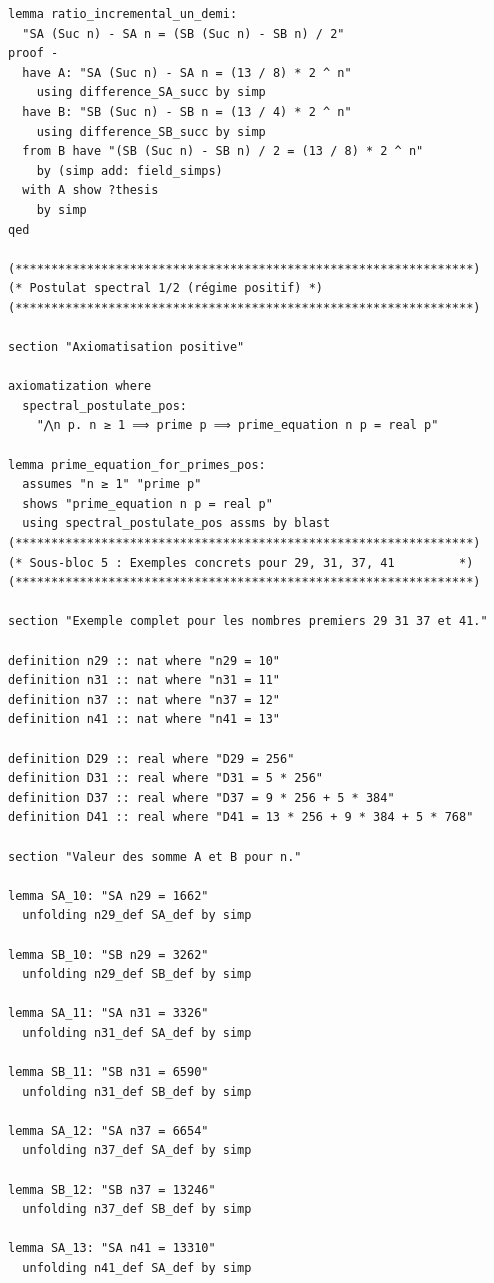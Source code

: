\documentclass[a4paper,11pt]{article}
\begin{document}
\begin{holcode}[title={\textcolor{white}{File: methode\_spectral.thy -- Part 1/4}}]
\begin{lstlisting}
lemma ratio_incremental_un_demi:
  "SA (Suc n) - SA n = (SB (Suc n) - SB n) / 2"
proof -
  have A: "SA (Suc n) - SA n = (13 / 8) * 2 ^ n"
    using difference_SA_succ by simp
  have B: "SB (Suc n) - SB n = (13 / 4) * 2 ^ n"
    using difference_SB_succ by simp
  from B have "(SB (Suc n) - SB n) / 2 = (13 / 8) * 2 ^ n"
    by (simp add: field_simps)
  with A show ?thesis
    by simp
qed

(****************************************************************)
(* Postulat spectral 1/2 (régime positif) *)
(****************************************************************)

section "Axiomatisation positive"

axiomatization where
  spectral_postulate_pos:
    "⋀n p. n ≥ 1 ⟹ prime p ⟹ prime_equation n p = real p"

lemma prime_equation_for_primes_pos:
  assumes "n ≥ 1" "prime p"
  shows "prime_equation n p = real p"
  using spectral_postulate_pos assms by blast
(****************************************************************)
(* Sous-bloc 5 : Exemples concrets pour 29, 31, 37, 41         *)
(****************************************************************)

section "Exemple complet pour les nombres premiers 29 31 37 et 41."

definition n29 :: nat where "n29 = 10"
definition n31 :: nat where "n31 = 11"
definition n37 :: nat where "n37 = 12"
definition n41 :: nat where "n41 = 13"

definition D29 :: real where "D29 = 256"
definition D31 :: real where "D31 = 5 * 256"
definition D37 :: real where "D37 = 9 * 256 + 5 * 384"
definition D41 :: real where "D41 = 13 * 256 + 9 * 384 + 5 * 768"

section "Valeur des somme A et B pour n."

lemma SA_10: "SA n29 = 1662"
  unfolding n29_def SA_def by simp

lemma SB_10: "SB n29 = 3262"
  unfolding n29_def SB_def by simp

lemma SA_11: "SA n31 = 3326"
  unfolding n31_def SA_def by simp

lemma SB_11: "SB n31 = 6590"
  unfolding n31_def SB_def by simp

lemma SA_12: "SA n37 = 6654"
  unfolding n37_def SA_def by simp

lemma SB_12: "SB n37 = 13246"
  unfolding n37_def SB_def by simp

lemma SA_13: "SA n41 = 13310"
  unfolding n41_def SA_def by simp


\end{lstlisting}
\end{holcode}
\end{document}
